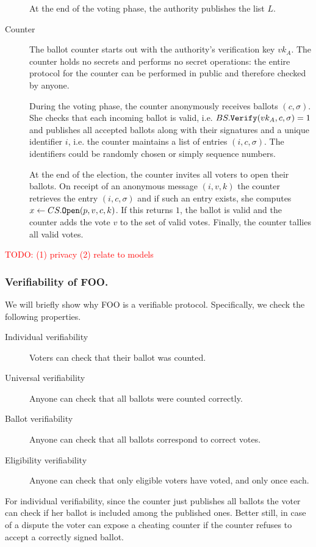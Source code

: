 \documentclass[envcountsame]{llncs}
\newcommand{\alg}[1]{\textup{\texttt{#1}}}
\begin{document}
\begin{description}
At the end of the voting phase, the authority publishes the list $L$.

\item[Counter]
The ballot counter starts out with the authority's verification key $vk_A$.
The counter holds no secrets and performs no secret operations: the entire
protocol for the counter can be performed in public and therefore checked by
anyone.

During the voting phase, the counter anonymously receives ballots $(c, \sigma)$.
She checks that each incoming ballot is valid, i.e. $BS.\alg{Verify}(vk_A, c,
\sigma) = 1$ and publishes all accepted ballots along with their signatures and
a unique identifier $i$, i.e. the counter maintains a list of entries $(i, c,
\sigma)$. The identifiers could be randomly chosen or simply sequence numbers.

At the end of the election, the counter invites all voters to open their
ballots. On receipt of an anonymous message $(i, v, k)$ the counter retrieves
the entry $(i, c, \sigma)$ and if such an entry exists, she computes $x \gets
CS.\alg{Open}(p, v, c, k)$. If this returns $1$, the ballot is valid and the
counter adds the vote $v$ to the set of valid votes. Finally, the counter
tallies all valid votes.
\end{description}

\textcolor{red}{TODO: (1) privacy (2) relate to models}

\subsubsection{Verifiability of FOO.}

We will briefly show why FOO is a verifiable protocol. Specifically, we check
the following properties.

\begin{description}
\item[Individual verifiability] Voters can check that their ballot was counted.
\item[Universal verifiability] Anyone can check that all ballots were counted
 correctly.
\item[Ballot verifiability] Anyone can check that all ballots correspond to
 correct votes.
\item[Eligibility verifiability] Anyone can check that only eligible voters have
voted, and only once each.
\end{description}

For individual verifiability, since the counter just publishes all ballots the
voter can check if her ballot is included among the published ones. Better
still, in case of a dispute the voter can expose a cheating counter if the
counter refuses to accept a correctly signed ballot.
\end{document}
